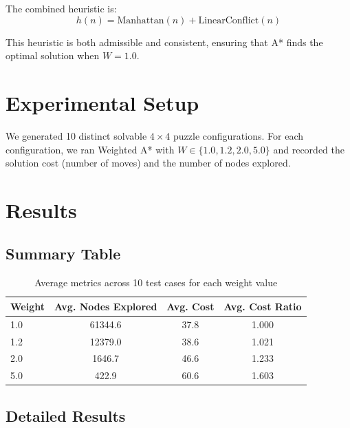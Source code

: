 \documentclass[12pt,a4paper]{article}
\begin{document}
The combined heuristic is:
\[
h(n) = \text{Manhattan}(n) + \text{LinearConflict}(n)
\]

This heuristic is both admissible and consistent, ensuring that A* finds the
optimal solution when $W = 1.0$.

\section{Experimental Setup}

We generated 10 distinct solvable $4 \times 4$ puzzle configurations. For each
configuration, we ran Weighted A* with $W \in \{1.0, 1.2, 2.0, 5.0\}$ and
recorded the solution cost (number of moves) and the number of nodes explored.

\section{Results}

\subsection*{Summary Table}

\begin{table}[ht!]
\centering
\caption{Average metrics across 10 test cases for each weight value}
\label{tab:summary}
\begin{tabular}{lSSS}
\toprule
{Weight} & {Avg. Nodes Explored} & {Avg. Cost} & {Avg. Cost Ratio} \\
 & 61344.6 & 37.8 & 1.000 \\
1.2 & 12379.0 & 38.6 & 1.021 \\
2.0 & 1646.7 & 46.6 & 1.233 \\
5.0 & 422.9 & 60.6 & 1.603 \\
\bottomrule
\end{tabular}
\end{table}

\subsection*{Detailed Results}
\end{document}
